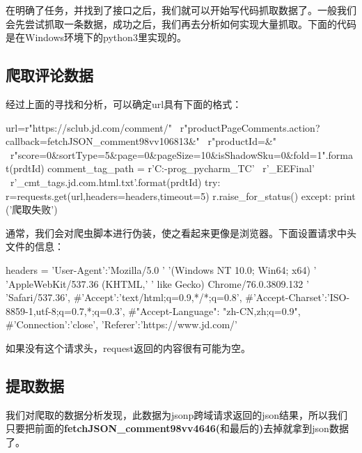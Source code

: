 在明确了任务，并找到了接口之后，我们就可以开始写代码抓取数据了。一般我们会先尝试抓取一条数据，成功之后，我们再去分析如何实现大量抓取。下面的代码是在Windows环境下的python3里实现的。

\subsection{爬取评论数据}
经过上面的寻找和分析，可以确定url具有下面的格式：
\begin{python}
url=r"https://sclub.jd.com/comment/" \
    r"productPageComments.action?callback=fetchJSON_comment98vv106813&" \
    r"productId={}&" \
    r"score=0&sortType=5&page=0&pageSize=10&isShadowSku=0&fold=1".format(prdtId)
comment_tag_path = r'C:\TC-prog\JetBrain_pycharm_TC' \
                   r'\PycharmProjects\Crawler_EEFinal' \
                   r'\jd_cmt_tags\httpsitem.jd.com{}.html.txt'.format(prdtId)
try:
    r=requests.get(url,headers=headers,timeout=5)
    r.raise_for_status()
except:
    print ('爬取失败')
\end{python}
通常，我们会对爬虫脚本进行伪装，使之看起来更像是浏览器。下面设置请求中头文件的信息：
\begin{python}
headers = {'User-Agent':'Mozilla/5.0 '
                        '(Windows NT 10.0; Win64; x64) '
                        'AppleWebKit/537.36 (KHTML,'
                        ' like Gecko) Chrome/76.0.3809.132 '
                        'Safari/537.36',
#'Accept':'text/html;q=0.9,*/*;q=0.8',
#'Accept-Charset':'ISO-8859-1,utf-8;q=0.7,*;q=0.3',
#"Accept-Language": "zh-CN,zh;q=0.9",
#'Connection':'close',
'Referer':'https://www.jd.com/'
}
\end{python}
如果没有这个请求头，request返回的内容很有可能为空。

\subsection{提取数据}
我们对爬取的数据分析发现，此数据为jsonp跨域请求返回的json结果，所以我们只要把前面的\textbf{fetchJSON\_comment98vv4646(}和最后的\textbf{)}去掉就拿到json数据了。

